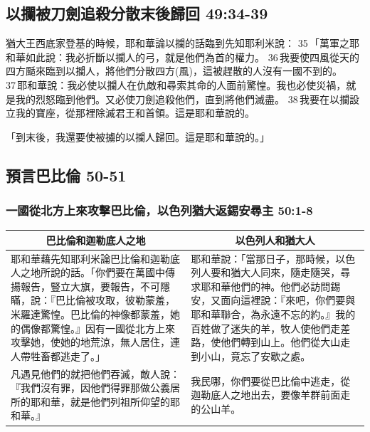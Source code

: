 \subsection{以攔被刀劍追殺分散末後歸回 49:34-39}
猶大王西底家登基的時候，耶和華論以攔的話臨到先知耶利米說： 35 「萬軍之耶和華如此說：我必折斷以攔人的弓，就是他們為首的權力。 36 我要使四風從天的四方颳來臨到以攔人，將他們分散四方(風)，這被趕散的人沒有一國不到的。 37 耶和華說：我必使以攔人在仇敵和尋索其命的人面前驚惶。我也必使災禍，就是我的烈怒臨到他們。又必使刀劍追殺他們，直到將他們滅盡。 38 我要在以攔設立我的寶座，從那裡除滅君王和首領。這是耶和華說的。


「到末後，我還要使被擄的以攔人歸回。這是耶和華說的。」

\subsection{預言巴比倫 50-51}
\subsubsection{一國從北方上來攻擊巴比倫，以色列猶大返錫安尋主 50:1-8}
\begin{table}[H]
\centering
\begin{tabular}{p{9.45cm}|p{8.0cm}}\hline\hline
\multicolumn{1}{c|}{巴比倫和迦勒底人之地}&\multicolumn{1}{c}{以色列人和猶大人}\\\hline
耶和華藉先知耶利米論巴比倫和迦勒底人之地所說的話。「你們要在萬國中傳揚報告，豎立大旗，要報告，不可隱瞞，說：『巴比倫被攻取，彼勒蒙羞，米羅達驚惶。巴比倫的神像都蒙羞，她的偶像都驚惶。』因有一國從北方上來攻擊她，使她的地荒涼，無人居住，連人帶牲畜都逃走了。」
&耶和華說：「當那日子，那時候，以色列人要和猶大人同來，隨走隨哭，尋求耶和華他們的神。他們必訪問錫安，又面向這裡說：『來吧，你們要與耶和華聯合，為永遠不忘的約。』我的百姓做了迷失的羊，牧人使他們走差路，使他們轉到山上。他們從大山走到小山，竟忘了安歇之處。 \\\hline

凡遇見他們的就把他們吞滅，敵人說：『我們沒有罪，因他們得罪那做公義居所的耶和華，就是他們列祖所仰望的耶和華。』 
&我民哪，你們要從巴比倫中逃走，從迦勒底人之地出去，要像羊群前面走的公山羊。\\\hline
\end{tabular}
\end{table}


